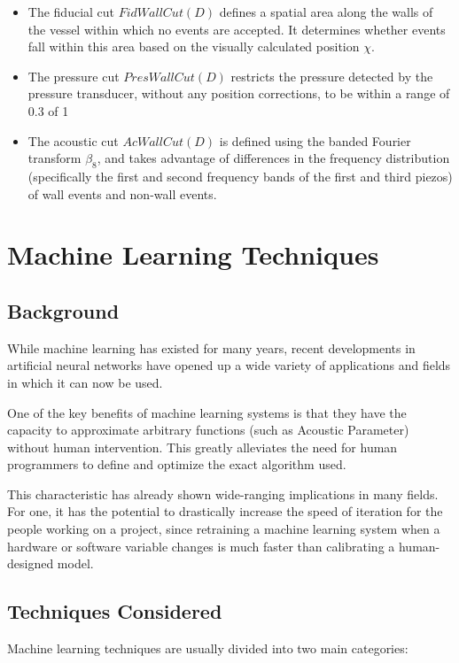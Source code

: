 \documentclass[10pt]{article}
\begin{document}
\begin{itemize}
    \item The fiducial cut $FidWallCut(D)$ defines a spatial area along the walls of the vessel within which no events are accepted. It determines whether events fall within this area based on the visually calculated position $\chi$.
    \item The pressure cut $PresWallCut(D)$ restricts the pressure detected by the pressure transducer, without any position corrections, to be within a range of 0.3 of 1
    \item The acoustic cut $AcWallCut(D)$ is defined using the banded Fourier transform $\beta_{8}$, and takes advantage of differences in the frequency distribution (specifically the first and second frequency bands of the first and third piezos) of wall events and non-wall events.
\end{itemize}

\section{Machine Learning Techniques}

\subsection{Background}

While machine learning has existed for many years, recent developments in artificial neural networks have opened up a wide variety of applications and fields in which it can now be used.

One of the key benefits of machine learning systems is that they have the capacity to approximate arbitrary functions (such as Acoustic Parameter) without human intervention. This greatly alleviates the need for human programmers to define and optimize the exact algorithm used.

This characteristic has already shown wide-ranging implications in many fields. For one, it has the potential to drastically increase the speed of iteration for the people working on a project, since retraining a machine learning system when a hardware or software variable changes is much faster than calibrating a human-designed model.

\subsection{Techniques Considered}

Machine learning techniques are usually divided into two main categories:
\end{document}
